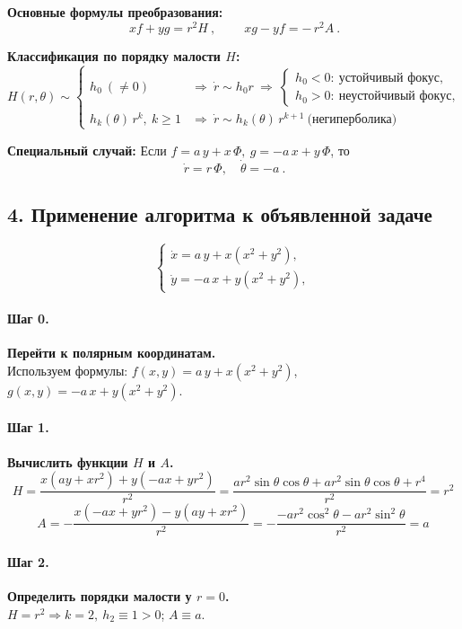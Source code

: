 \textbf{Основные формулы преобразования:}
\[
\boxed{\ x f+y g=r^{2}H\ },\qquad
\boxed{\ x g-y f=-\,r^{2}A\ }.
\]

\textbf{Классификация по порядку малости \(H\):}
\[
H(r,\theta)\sim
\begin{cases}
h_0\ (\neq0) &\Rightarrow\ \dot r\sim h_0 r\ \Rightarrow\
\begin{cases}
h_0<0:\ \text{устойчивый фокус},\\
h_0>0:\ \text{неустойчивый фокус},
\end{cases}\\[6pt]
h_k(\theta)\,r^{k},\ k\ge1 &\Rightarrow\ \dot r\sim h_k(\theta)\,r^{k+1}\ \text{(негиперболика)}
\end{cases}
\]

\textbf{Специальный случай:} Если \(f=a\,y+x\,\Phi,\ g=-a\,x+y\,\Phi\), то
\[
\boxed{\ \dot r=r\,\Phi,\quad \dot\theta=-a\ }.
\]

\subsection*{4. Применение алгоритма к объявленной задаче}

\[
\begin{cases}
\dot{x}=a\,y+x(x^{2}+y^{2}),\\
\dot{y}=-a\,x+y(x^{2}+y^{2}),
\end{cases}
\]

\paragraph{Шаг 0.} \textbf{Перейти к полярным координатам.}\\
Используем формулы: \(f(x,y)=a\,y+x(x^{2}+y^{2})\), \(g(x,y)=-a\,x+y(x^{2}+y^{2})\).

\paragraph{Шаг 1.} \textbf{Вычислить функции \(H\) и \(A\).}\\
\[
H=\frac{x(ay+xr^{2})+y(-ax+yr^{2})}{r^{2}}=\frac{ar^{2}\sin\theta\cos\theta+ar^{2}\sin\theta\cos\theta+r^{4}}{r^{2}}=r^{2}
\]
\[
A=-\frac{x(-ax+yr^{2})-y(ay+xr^{2})}{r^{2}}=-\frac{-ar^{2}\cos^{2}\theta-ar^{2}\sin^{2}\theta}{r^{2}}=a
\]

\paragraph{Шаг 2.} \textbf{Определить порядки малости у \(r=0\).}\\
\(H=r^{2}\Rightarrow k=2,\ h_2\equiv1>0\); \(A\equiv a\).

